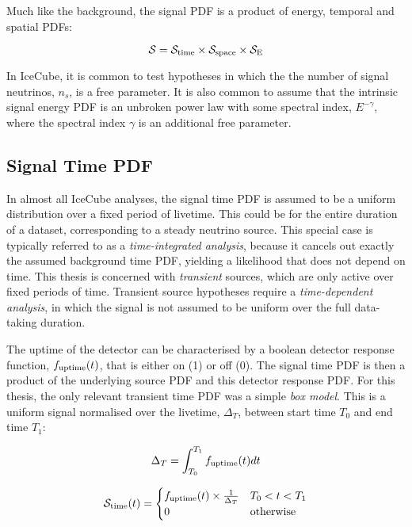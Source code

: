 Much like the background, the signal PDF is a product of energy, temporal and spatial PDFs:

\begin{equation}
\mathcal{S} =  \mathcal{S}_{\textup{time}} \times  \mathcal{S}_{\textup{space}} \times\mathcal{S}_{\textup{E}}
\end{equation}

In IceCube, it is common to test hypotheses in which the the number of signal neutrinos, $n_{s}$, is a free parameter. It is also common to assume that the intrinsic signal energy PDF is an unbroken power law with some spectral index, $E^{-\gamma}$, where the spectral index $\gamma$ is an additional free parameter. 

\subsection*{Signal Time PDF}

In almost all IceCube analyses, the signal time PDF is assumed to be a uniform distribution over a fixed period of livetime. This could be for the entire duration of a dataset, corresponding to a steady neutrino source. This special case is typically referred to as a \emph{time-integrated analysis}, because it cancels out exactly the assumed background time PDF, yielding a likelihood that does not depend on time. This thesis is concerned with \emph{transient} sources, which are only active over fixed periods of time.  Transient source hypotheses require a \emph{time-dependent analysis}, in which the signal is not assumed to be uniform over the full data-taking duration.

The uptime of the detector can be characterised by a boolean detector response function, $f_{\textup{uptime}}(t)$, that is either on (1) or off (0). The signal time PDF is then a product of the underlying source PDF and this detector response PDF. For this thesis, the only relevant transient time PDF was a simple \emph{box model}. This is a uniform signal normalised over the livetime, $\Delta_{T}$, between start time $T_{0}$ and end time $T_{1}$:

\begin{equation}
\Delta_{T} = \int_{T_{0}}^{T_{1}}f_{\textup{uptime}}(t) dt
\end{equation}

\begin{equation}
\mathcal{S}_{\textup{time}} (t)= 
\begin{cases}
	f_{\textup{uptime}}(t) \times \frac{1}{\Delta_{T}} & T_{0} < t < T_{1}\\
	0 & \textup{otherwise}\\
\end{cases}
\end{equation}

